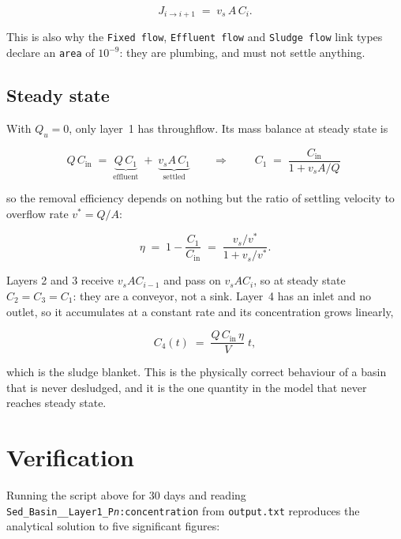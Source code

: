 \documentclass[11pt,a4paper]{article}
\newcommand{\code}[1]{\texttt{\small #1}}
\newcommand{\file}[1]{\texttt{\small #1}}
\begin{document}
\begin{equation}
J_{i \rightarrow i+1} \;=\; v_s\, A\, C_i .
\end{equation}

This is also why the \code{Fixed flow}, \code{Effluent flow} and
\code{Sludge flow} link types declare an \code{area} of $10^{-9}$: they are
plumbing, and must not settle anything.

\subsection{Steady state}

With $Q_u=0$, only layer~1 has throughflow. Its mass balance at steady state is

\begin{equation}
Q\,C_\mathrm{in} \;=\; \underbrace{Q\,C_1}_{\text{effluent}} \;+\; \underbrace{v_s A\, C_1}_{\text{settled}}
\qquad\Longrightarrow\qquad
\boxed{\;C_1 \;=\; \frac{C_\mathrm{in}}{1 + v_s A/Q}\;}
\end{equation}

so the removal efficiency depends on nothing but the ratio of settling velocity
to overflow rate $v^{*}=Q/A$:

\begin{equation}
\eta \;=\; 1-\frac{C_1}{C_\mathrm{in}} \;=\; \frac{v_s/v^{*}}{1+v_s/v^{*}} .
\end{equation}

Layers 2 and 3 receive $v_sAC_{i-1}$ and pass on $v_sAC_i$, so at steady state
$C_2=C_3=C_1$: they are a conveyor, not a sink. Layer~4 has an inlet and no
outlet, so it accumulates at a constant rate and its concentration grows
linearly,

\begin{equation}
C_4(t) \;=\; \frac{Q\,C_\mathrm{in}\,\eta}{V}\; t ,
\end{equation}

which is the sludge blanket. This is the physically correct behaviour of a basin
that is never desludged, and it is the one quantity in the model that never
reaches steady state.

\section{Verification}
\label{sec:verify}

Running the script above for 30 days and reading
\code{Sed\_Basin\_\_Layer1\_P\emph{n}:concentration} from \file{output.txt}
reproduces the analytical solution to five significant figures:
\end{document}
